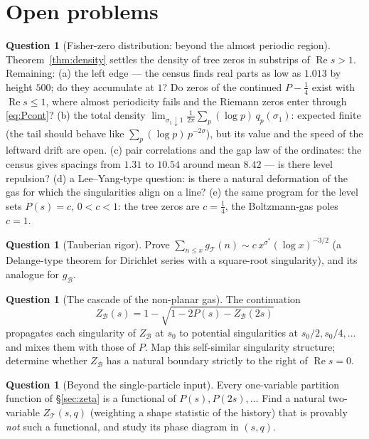 \documentclass[11pt]{article}
\newcommand{\cT}{\mathcal{T}}   %
\newcommand{\cB}{\mathcal{B}}   %
\numberwithin{equation}{section}
\theoremstyle{plain}
\theoremstyle{definition}
\newtheorem{question}[theorem]{Question}
\theoremstyle{remark}
\begin{document}
\section{Open problems}\label{sec:open}

\begin{question}[Fisher-zero distribution: beyond the almost periodic region]
\label{prob:zeros}
Theorem~\ref{thm:density} settles the density of tree zeros in substrips of
$\operatorname{Re} s > 1$. Remaining: (a) the left edge --- the census finds real
parts as low as $1.013$ by height $500$; do they accumulate at $1$? Do zeros of the
continued $P - \tfrac14$ exist with $\operatorname{Re} s \le 1$, where almost
periodicity fails and the Riemann zeros enter through \eqref{eq:Pcont}? (b) the total
density $\lim_{\sigma_1 \downarrow 1} \frac{1}{2\pi}\sum_p (\log p)\,
q_p(\sigma_1)$: expected finite (the tail should behave like
$\sum_p (\log p)\, p^{-2\sigma}$), but its value and the speed of the leftward drift
are open. (c) pair correlations and the gap law of the ordinates: the census gives
spacings from $1.31$ to $10.54$ around mean $8.42$ --- is there level repulsion?
(d) a Lee--Yang-type question: is there a natural deformation of the gas for which
the singularities align on a line? (e) the same program for the level sets
$P(s) = c$, $0 < c < 1$: the tree zeros are $c = \tfrac14$, the Boltzmann-gas poles
$c = 1$.
\end{question}

\begin{question}[Tauberian rigor]\label{prob:tauberian}
Prove $\sum_{n \le x} g_\cT(n) \sim c\, x^{\sigma^{*}} (\log x)^{-3/2}$ (a
Delange-type theorem for Dirichlet series with a square-root singularity), and its
analogue for $g_\cB$.
\end{question}

\begin{question}[The cascade of the non-planar gas]\label{prob:cascade}
The continuation
\[
Z_\cB(s) = 1 - \sqrt{1 - 2P(s) - Z_\cB(2s)}
\]
propagates each singularity of $Z_\cB$ at $s_0$ to potential singularities at
$s_0/2, s_0/4, \dots$ and mixes them with those of $P$. Map this self-similar singularity structure;
determine whether $Z_\cB$ has a natural boundary strictly to the right of
$\operatorname{Re} s = 0$.
\end{question}

\begin{question}[Beyond the single-particle input]\label{prob:twovar}
Every one-variable partition function of \S\ref{sec:zeta} is a functional of
$P(s), P(2s), \dots$ Find a natural two-variable $Z_\cT(s,q)$ (weighting a shape
statistic of the history) that is provably \emph{not} such a functional, and study its
phase diagram in $(s,q)$.
\end{question}
\end{document}
